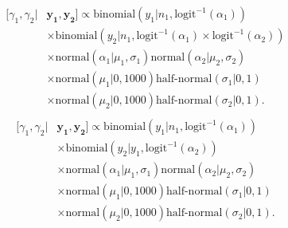 \documentclass[12pt, oneside, titlepage]{article}   	%
\begin{document}
\begin{align}
  \begin{split}
 [  \gamma_1, \gamma_2  | & \bm{y_1} , \bm{y_2} ] \propto 
   \mathrm{binomial} ( y_1 | n_1, \mathrm{logit}^{-1}( \alpha_1 ) )  
      \\ & \times \mathrm{binomial} ( y_2 | n_1, \mathrm{logit}^{-1}( \alpha_1 ) \times \mathrm{logit}^{-1}( \alpha_2 ) ) 
   \\ & \times \mathrm{normal} ( \alpha_1  | \mu_1, \sigma_1 ) \mathrm{normal} ( \alpha_2  | \mu_2, \sigma_2 )
  \\ & \times \mathrm{normal} ( \mu_1 | 0 , 1000 ) \textrm{half-normal} ( \sigma_1 | 0,1)
    \\ & \times \mathrm{normal} ( \mu_2 | 0 , 1000 ) \textrm{half-normal} ( \sigma_2 | 0,1).
  \end{split}
\end{align}
%
\begin{align}
  \begin{split}
 [  \gamma_1, \gamma_2  | & \bm{y_1} , \bm{y_2} ] \propto 
   \mathrm{binomial} ( y_1 | n_1, \mathrm{logit}^{-1}( \alpha_1 ) )
      \\ & \times  \mathrm{binomial} ( y_2 | y_1, \mathrm{logit}^{-1}( \alpha_2 ) ) 
   \\ & \times \mathrm{normal} ( \alpha_1  | \mu_1, \sigma_1 ) \mathrm{normal} ( \alpha_2  | \mu_2, \sigma_2 )
  \\ & \times \mathrm{normal} ( \mu_1 | 0 , 1000 ) \textrm{half-normal} ( \sigma_1 | 0,1)
    \\ & \times \mathrm{normal} ( \mu_2 | 0 , 1000 ) \textrm{half-normal} ( \sigma_2 | 0,1).
  \end{split}
\end{align}
%

\clearpage
\newpage
\end{document}

